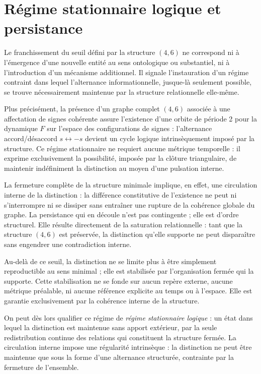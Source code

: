 \documentclass[11pt,a4paper]{article}
\begin{document}
\section{Régime stationnaire logique et persistance}

Le franchissement du seuil défini par la structure \(\left(4,6\right)\) ne correspond ni à l’émergence d’une nouvelle entité au sens ontologique ou substantiel, ni à l’introduction d’un mécanisme additionnel. Il signale l’instauration d’un régime contraint dans lequel l’alternance informationnelle, jusque-là seulement possible, se trouve nécessairement maintenue par la structure relationnelle elle-même.

Plus précisément, la présence d’un graphe complet \(\left(4,6\right)\) associée à une affectation de signes cohérente assure l’existence d’une orbite de période 2 pour la dynamique \(F\) sur l’espace des configurations de signes : l’alternance accord/désaccord \(s \leftrightarrow -s\) devient un cycle logique intrinsèquement imposé par la structure. Ce régime stationnaire ne requiert aucune métrique temporelle : il exprime exclusivement la possibilité, imposée par la clôture triangulaire, de maintenir indéfiniment la distinction au moyen d’une pulsation interne.

La fermeture complète de la structure minimale implique, en effet, une circulation interne de la distinction : la différence constitutive de l’existence ne peut ni s’interrompre ni se dissiper sans entraîner une rupture de la cohérence globale du graphe. La persistance qui en découle n’est pas contingente ; elle est d’ordre structurel. Elle résulte directement de la saturation relationnelle : tant que la structure \(\left(4,6\right)\) est préservée, la distinction qu’elle supporte ne peut disparaître sans engendrer une contradiction interne.

Au-delà de ce seuil, la distinction ne se limite plus à être simplement reproductible au sens minimal ; elle est stabilisée par l’organisation fermée qui la supporte. Cette stabilisation ne se fonde sur aucun repère externe, aucune métrique préalable, ni aucune référence explicite au temps ou à l’espace. Elle est garantie exclusivement par la cohérence interne de la structure.

On peut dès lors qualifier ce régime de \emph{régime stationnaire logique} : un état dans lequel la distinction est maintenue sans apport extérieur, par la seule redistribution continue des relations qui constituent la structure fermée. La circulation interne impose une régularité intrinsèque : la distinction ne peut être maintenue que sous la forme d’une alternance structurée, contrainte par la fermeture de l’ensemble.
\end{document}
